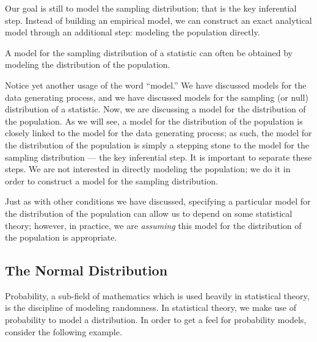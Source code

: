 \documentclass[
  letterpaper,
  DIV=11,
  numbers=noendperiod]{scrreprt}
\theoremstyle{definition}
\theoremstyle{definition}
\theoremstyle{plain}
\theoremstyle{remark}
\begin{document}
Our goal is still to model the sampling distribution; that is the key
inferential step. Instead of building an empirical model, we can
construct an exact analytical model through an additional step: modeling
the population directly.

\begin{tcolorbox}[enhanced jigsaw, colbacktitle=quarto-callout-tip-color!10!white, colback=white, left=2mm, title=\textcolor{quarto-callout-tip-color}{\faLightbulb}\hspace{0.5em}{Big Idea}, toptitle=1mm, leftrule=.75mm, breakable, bottomrule=.15mm, arc=.35mm, rightrule=.15mm, toprule=.15mm, coltitle=black, opacityback=0, colframe=quarto-callout-tip-color-frame, opacitybacktitle=0.6, bottomtitle=1mm, titlerule=0mm]

A model for the sampling distribution of a statistic can often be
obtained by modeling the distribution of the population.

\end{tcolorbox}

Notice yet another usage of the word ``model.'' We have discussed models
for the data generating process, and we have discussed models for the
sampling (or null) distribution of a statistic. Now, we are discussing a
model for the distribution of the population. As we will see, a model
for the distribution of the population is closely linked to the model
for the data generating process; as such, the model for the distribution
of the population is simply a stepping stone to the model for the
sampling distribution --- the key inferential step. It is important to
separate these steps. We are not interested in directly modeling the
population; we do it in order to construct a model for the sampling
distribution.

Just as with other conditions we have discussed, specifying a particular
model for the distribution of the population can allow us to depend on
some statistical theory; however, in practice, we are \emph{assuming}
this model for the distribution of the population is appropriate.

\subsection{The Normal Distribution}\label{the-normal-distribution}

Probability, a sub-field of mathematics which is used heavily in
statistical theory, is the discipline of modeling randomness. In
statistical theory, we make use of probability to model a distribution.
In order to get a feel for probability models, consider the following
example.
\end{document}
